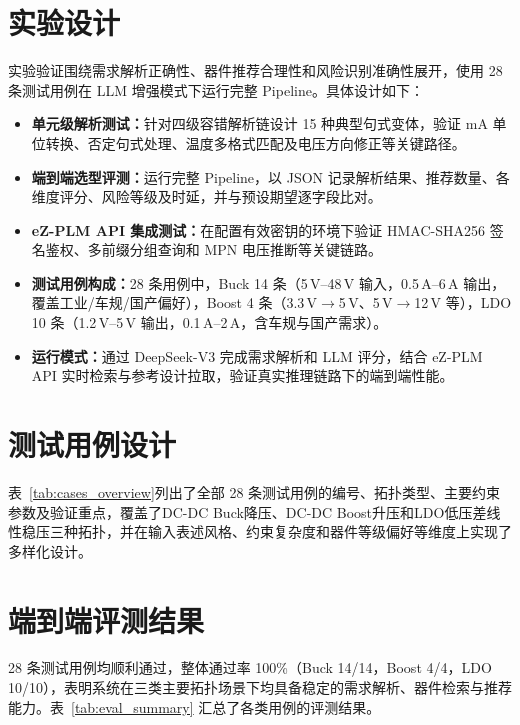 \section{实验设计}
实验验证围绕需求解析正确性、器件推荐合理性和风险识别准确性展开，使用 28 条测试用例在 LLM 增强模式下运行完整 Pipeline。具体设计如下：
\begin{itemize}
    \item \textbf{单元级解析测试：}针对四级容错解析链设计 15 种典型句式变体，验证 mA 单位转换、否定句式处理、温度多格式匹配及电压方向修正等关键路径。

    \item \textbf{端到端选型评测：}运行完整 Pipeline，以 JSON 记录解析结果、推荐数量、各维度评分、风险等级及时延，并与预设期望逐字段比对。

    \item \textbf{eZ-PLM API 集成测试：}在配置有效密钥的环境下验证 HMAC-SHA256 签名鉴权、多前缀分组查询和 MPN 电压推断等关键链路。

    \item \textbf{测试用例构成：}28 条用例中，Buck 14 条（5\,V--48\,V 输入，0.5\,A--6\,A 输出，覆盖工业/车规/国产偏好），Boost 4 条（3.3\,V$\rightarrow$5\,V、5\,V$\rightarrow$12\,V 等），LDO 10 条（1.2\,V--5\,V 输出，0.1\,A--2\,A，含车规与国产需求）。

    \item \textbf{运行模式：}通过 DeepSeek-V3 完成需求解析和 LLM 评分，结合 eZ-PLM API 实时检索与参考设计拉取，验证真实推理链路下的端到端性能。
\end{itemize}

\section{测试用例设计}

表~\ref{tab:cases_overview}列出了全部 28 条测试用例的编号、拓扑类型、主要约束参数及验证重点，覆盖了DC-DC Buck降压、DC-DC Boost升压和LDO低压差线性稳压三种拓扑，并在输入表述风格、约束复杂度和器件等级偏好等维度上实现了多样化设计。



\section{端到端评测结果}
28 条测试用例均顺利通过，整体通过率 100\%（Buck 14/14，Boost 4/4，LDO 10/10），表明系统在三类主要拓扑场景下均具备稳定的需求解析、器件检索与推荐能力。表~\ref{tab:eval_summary} 汇总了各类用例的评测结果。

